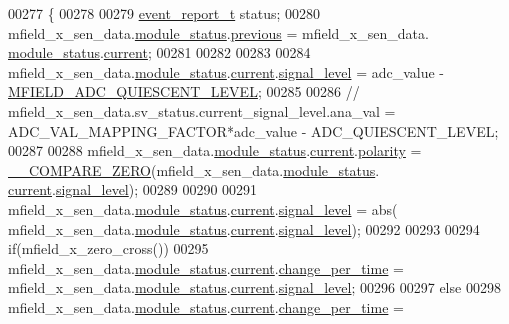 \begin{DoxyCode}
00277 \{
00278 
00279     \hyperlink{a00021_d6/d66/a00441}{event\_report\_t} status;
00280     mfield\_x\_sen\_data.\hyperlink{a00025_adfab5a5d8b45a93dfb13edb24e2b80e3}{module\_status}.\hyperlink{a00019_adcb859b2f3983a9c58deab28e59c333f}{previous} = mfield\_x\_sen\_data.
      \hyperlink{a00025_adfab5a5d8b45a93dfb13edb24e2b80e3}{module\_status}.\hyperlink{a00019_acf41ffc11da291c2f9f0fcb02ee72b98}{current};
00281 
00282 
00283 
00284     mfield\_x\_sen\_data.\hyperlink{a00025_adfab5a5d8b45a93dfb13edb24e2b80e3}{module\_status}.\hyperlink{a00019_acf41ffc11da291c2f9f0fcb02ee72b98}{current}.\hyperlink{a00019_a4070db8eab0ff93e3fbc1df59872f117}{signal\_level} = adc\_value - 
      \hyperlink{a00019_a2310c2bd339d54b86e9fae262def2008}{MFIELD\_ADC\_QUIESCENT\_LEVEL};
00285 
00286    \textcolor{comment}{// mfield\_x\_sen\_data.sv\_status.current\_signal\_level.ana\_val = ADC\_VAL\_MAPPING\_FACTOR*adc\_value -
       ADC\_QUIESCENT\_LEVEL;}
00287 
00288     mfield\_x\_sen\_data.\hyperlink{a00025_adfab5a5d8b45a93dfb13edb24e2b80e3}{module\_status}.\hyperlink{a00019_acf41ffc11da291c2f9f0fcb02ee72b98}{current}.\hyperlink{a00019_a45152a3cd909463d7c924c30b575a073}{polarity} = 
      \hyperlink{a00021_ad4d76cc0f801d947fd957435649b95bc}{\_\_COMPARE\_ZERO}(mfield\_x\_sen\_data.\hyperlink{a00025_adfab5a5d8b45a93dfb13edb24e2b80e3}{module\_status}.
      \hyperlink{a00019_acf41ffc11da291c2f9f0fcb02ee72b98}{current}.\hyperlink{a00019_a4070db8eab0ff93e3fbc1df59872f117}{signal\_level});
00289 
00290 
00291     mfield\_x\_sen\_data.\hyperlink{a00025_adfab5a5d8b45a93dfb13edb24e2b80e3}{module\_status}.\hyperlink{a00019_acf41ffc11da291c2f9f0fcb02ee72b98}{current}.\hyperlink{a00019_a4070db8eab0ff93e3fbc1df59872f117}{signal\_level} = abs(
      mfield\_x\_sen\_data.\hyperlink{a00025_adfab5a5d8b45a93dfb13edb24e2b80e3}{module\_status}.\hyperlink{a00019_acf41ffc11da291c2f9f0fcb02ee72b98}{current}.\hyperlink{a00019_a4070db8eab0ff93e3fbc1df59872f117}{signal\_level});
00292 
00293 
00294     \textcolor{keywordflow}{if}(mfield\_x\_zero\_cross())
00295     mfield\_x\_sen\_data.\hyperlink{a00025_adfab5a5d8b45a93dfb13edb24e2b80e3}{module\_status}.\hyperlink{a00019_acf41ffc11da291c2f9f0fcb02ee72b98}{current}.\hyperlink{a00019_a0f645dd76b41adc6a966feba8e4bff8c}{change\_per\_time} = 
      mfield\_x\_sen\_data.\hyperlink{a00025_adfab5a5d8b45a93dfb13edb24e2b80e3}{module\_status}.\hyperlink{a00019_acf41ffc11da291c2f9f0fcb02ee72b98}{current}.\hyperlink{a00019_a4070db8eab0ff93e3fbc1df59872f117}{signal\_level};
00296 
00297     \textcolor{keywordflow}{else}
00298     mfield\_x\_sen\_data.\hyperlink{a00025_adfab5a5d8b45a93dfb13edb24e2b80e3}{module\_status}.\hyperlink{a00019_acf41ffc11da291c2f9f0fcb02ee72b98}{current}.\hyperlink{a00019_a0f645dd76b41adc6a966feba8e4bff8c}{change\_per\_time} = 

\end{DoxyCode}
